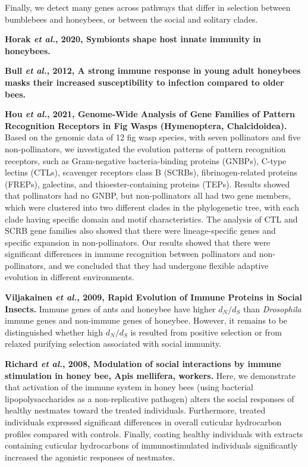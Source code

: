 \documentclass[11pt]{article}
\begin{document}
\begin{sloppypar}
Finally, we detect many genes across pathways that differ in selection between bumblebees and honeybees, or between the social and solitary clades.
\par
\textbf{Horak \textit{et al.}, 2020, Symbionts shape host innate immunity in honeybees.} \newline
\par
\textbf{Bull \textit{et al.}, 2012, A strong immune response in young adult honeybees masks their increased susceptibility to infection compared to older bees.}
\par
\textbf{Hou \textit{et al.}, 2021, Genome-Wide Analysis of Gene Families of Pattern Recognition Receptors in Fig Wasps (Hymenoptera, Chalcidoidea).} \newline
Based on the genomic data of 12 fig wasp species, with seven pollinators and five non-pollinators, we investigated the evolution patterns of pattern recognition receptors, such as Gram-negative bacteria-binding proteins (GNBPs), C-type lectins (CTLs), scavenger receptors class B (SCRBs), fibrinogen-related proteins (FREPs), galectins, and thioester-containing proteins (TEPs). 
Results showed that pollinators had no GNBP, but non-pollinators all had two gene members, which were clustered into two different clades in the phylogenetic tree, with each clade having specific domain and motif characteristics. 
The analysis of CTL and SCRB gene families also showed that there were lineage-specific genes and specific expansion in non-pollinators. 
Our results showed that there were significant differences in immune recognition between pollinators and non-pollinators, and we concluded that they had undergone flexible adaptive evolution in different environments.
\par
\textbf{Viljakainen \textit{et al.}, 2009, Rapid Evolution of Immune Proteins in Social Insects.} \newline
Immune genes of ants and honeybee have higher $d_N/d_S$ than \textit{Drosophila} immune genes and non-immune genes of honeybee. 
However, it remains to be distinguished whether high $d_N/d_S$ is resulted from positive selection or from relaxed purifying selection associated with social immunity.
\par
\textbf{Richard \textit{et al.}, 2008, Modulation of social interactions by immune stimulation in honey bee, Apis mellifera, workers.} \newline
Here, we demonstrate that activation of the immune system in honey bees (using bacterial lipopolysaccharides as a non-replicative pathogen) alters the social responses of healthy nestmates toward the treated individuals. 
Furthermore, treated individuals expressed significant differences in overall cuticular hydrocarbon profiles compared with controls. 
Finally, coating healthy individuals with extracts containing cuticular hydrocarbons of immunostimulated individuals significantly increased the agonistic responses of nestmates.

\end{sloppypar}
\end{document}
